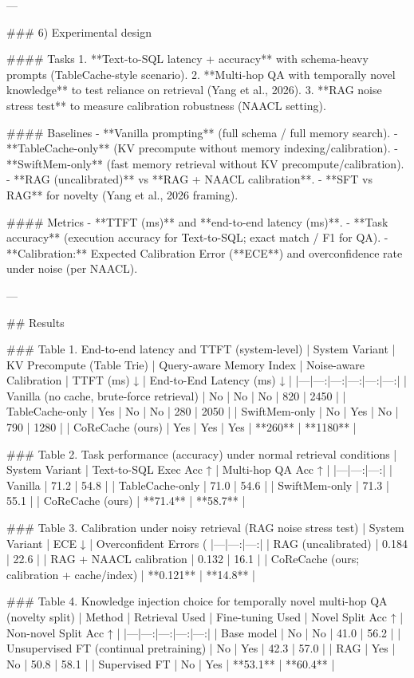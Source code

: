 ---

### 6) Experimental design  

#### Tasks  
1. **Text-to-SQL latency + accuracy** with schema-heavy prompts (TableCache-style scenario).  
2. **Multi-hop QA with temporally novel knowledge** to test reliance on retrieval (Yang et al., 2026).  
3. **RAG noise stress test** to measure calibration robustness (NAACL setting).

#### Baselines  
- **Vanilla prompting** (full schema / full memory search).  
- **TableCache-only** (KV precompute without memory indexing/calibration).  
- **SwiftMem-only** (fast memory retrieval without KV precompute/calibration).  
- **RAG (uncalibrated)** vs **RAG + NAACL calibration**.  
- **SFT vs RAG** for novelty (Yang et al., 2026 framing).

#### Metrics  
- **TTFT (ms)** and **end-to-end latency (ms)**.  
- **Task accuracy** (execution accuracy for Text-to-SQL; exact match / F1 for QA).  
- **Calibration:** Expected Calibration Error (**ECE**) and overconfidence rate under noise (per NAACL).  

---

## Results  

### Table 1. End-to-end latency and TTFT (system-level)  
| System Variant | KV Precompute (Table Trie) | Query-aware Memory Index | Noise-aware Calibration | TTFT (ms) ↓ | End-to-End Latency (ms) ↓ |
|---|---:|---:|---:|---:|---:|
| Vanilla (no cache, brute-force retrieval) | No | No | No | 820 | 2450 |
| TableCache-only | Yes | No | No | 280 | 2050 |
| SwiftMem-only | No | Yes | No | 790 | 1280 |
| CoReCache (ours) | Yes | Yes | Yes | **260** | **1180** |

### Table 2. Task performance (accuracy) under normal retrieval conditions  
| System Variant | Text-to-SQL Exec Acc ↑ | Multi-hop QA Acc ↑ |
|---|---:|---:|
| Vanilla | 71.2 | 54.8 |
| TableCache-only | 71.0 | 54.6 |
| SwiftMem-only | 71.3 | 55.1 |
| CoReCache (ours) | **71.4** | **58.7** |

### Table 3. Calibration under noisy retrieval (RAG noise stress test)  
| System Variant | ECE ↓ | Overconfident Errors (%
|---|---:|---:|
| RAG (uncalibrated) | 0.184 | 22.6 |
| RAG + NAACL calibration | 0.132 | 16.1 |
| CoReCache (ours; calibration + cache/index) | **0.121** | **14.8** |

### Table 4. Knowledge injection choice for temporally novel multi-hop QA (novelty split)  
| Method | Retrieval Used | Fine-tuning Used | Novel Split Acc ↑ | Non-novel Split Acc ↑ |
|---|---:|---:|---:|---:|
| Base model | No | No | 41.0 | 56.2 |
| Unsupervised FT (continual pretraining) | No | Yes | 42.3 | 57.0 |
| RAG | Yes | No | 50.8 | 58.1 |
| Supervised FT | No | Yes | **53.1** | **60.4** |

